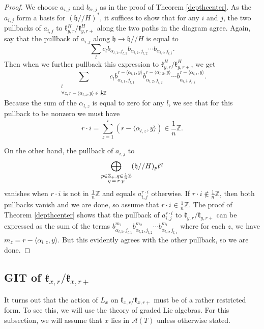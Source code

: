 \documentclass[12pt]{article}
\theoremstyle{remark}
\begin{document}
\begin{proof}

We choose $a_{i,j}$ and $b_{\alpha,j}$ as in the proof of Theorem \ref{depthcenter}. As the $a_{i,j}$ form a basis for $(\mathfrak{h}//H)^*$, it suffices to show that for any $i$ and $j$, the two pullbacks of $a_{i,j}$ to $\mathfrak{k}_{y,r}^H/\mathfrak{k}_{y,r+}^H$ along the two paths in the diagram agree. Again, say that the pullback of $a_{i,j}$ along $\mathfrak{h}\rightarrow\mathfrak{h}//H$ is equal to
\[
\displaystyle\sum_{l}c_{l}b_{\alpha_{l,1},j_{l,1}}b_{\alpha_{l,2},j_{l,2}}\cdots b_{\alpha_{l,i},j_{l,i}}.
\]
Then when we further pullback this expression to $\mathfrak{k}_{y,r}^H/\mathfrak{k}_{y,r+}^H$, we get
\[
\displaystyle\sum_{\substack{l\\ \forall z, r-\langle\alpha_{l,z},y\rangle\in\frac{1}{n}\mathbb{Z}}}c_{l}b_{\alpha_{l,1},j_{l,1}}^{r-\langle\alpha_{l,1},y\rangle}b_{\alpha_{l,2},j_{l,2}}^{r-\langle\alpha_{l,2},y\rangle}\cdots b_{\alpha_{l,i},j_{l,i}}^{r-\langle\alpha_{l,i},y\rangle}.
\]
Because the sum of the $\alpha_{l,z}$ is equal to zero for any $l$, we see that for this pullback to be nonzero we must have
\[
r\cdot i=\displaystyle\sum_{z=1}^i(r-\langle\alpha_{l,z},y\rangle)\in\frac{1}{n}\mathbb{Z}.
\]

On the other hand, the pullback of $a_{i,j}$ to
\[
\displaystyle\bigoplus_{\substack{p\in\mathbb{Z}_+,q\in\frac{1}{n}\mathbb{Z}\\ q\thinspace=\thinspace r\cdot p}}(\mathfrak{h}//H)_pt^q
\]
vanishes when $r\cdot i$ is not in $\frac{1}{n}\mathbb{Z}$ and equals $a_{i,j}^{r\cdot i}$ otherwise. If $r\cdot i\not\in\frac{1}{n}\mathbb{Z}$, then both pullbacks vanish and we are done, so assume that $r\cdot i\in\frac{1}{n}\mathbb{Z}.$ The proof of Theorem \ref{depthcenter} shows that the pullback of $a_{i,j}^{r\cdot i}$ to $\mathfrak{k}_{y,r}/\mathfrak{k}_{y,r+}$ can be expressed as the sum of the terms $b_{\alpha_{l,1},j_{l,1}}^{m_1}b_{\alpha_{l,2},j_{l,2}}^{m_2}\cdots b_{\alpha_{l,i},j_{l,i}}^{m_i}$ where for each $z$, we have $m_z=r-\langle\alpha_{l,z},y\rangle.$ But this evidently agrees with the other pullback, so we are done.
\end{proof}

\subsection{GIT of $\mathfrak{k}_{x,r}/\mathfrak{k}_{x,r+}$}\label{ss:grading}

It turns out that the action of $L_x$ on $\mathfrak{k}_{x,r}/\mathfrak{k}_{x,r+}$ must be of a rather restricted form. To see this, we will use the theory of graded Lie algebras. For this subsection, we will assume that $x$ lies in $\mathcal{A}(T)$ unless otherwise stated.
\end{document}
